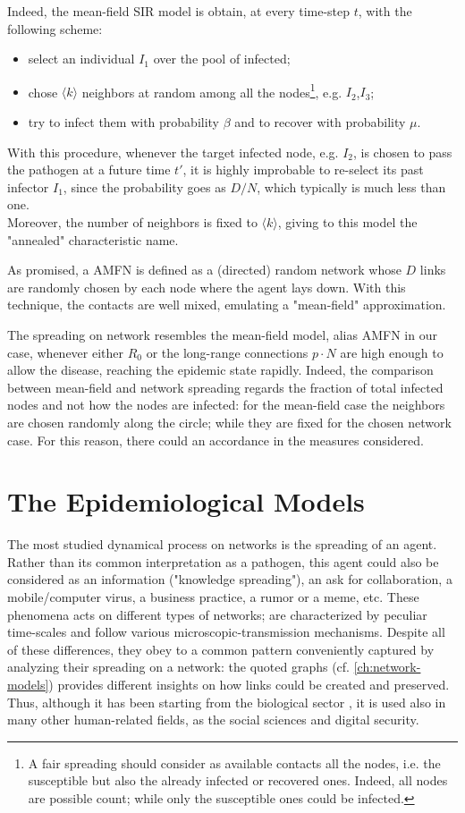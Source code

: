 \documentclass[a4paper,10pt,twoside]{book} %
\theoremstyle{definition}
\begin{document}
Indeed, the mean-field SIR model is obtain, at every time-step $t$, with the following scheme: 
\begin{itemize}
	\item select an individual $I_1$ over the pool of infected;
	\item chose $\langle k \rangle$ neighbors at random among all the nodes\footnote{A fair spreading should consider as available contacts all the nodes, i.e. the susceptible but also the already infected or recovered ones. Indeed, all nodes are possible count; while only the susceptible ones could be infected.}, e.g. $I_2$,$I_3$;
	\item try to infect them with probability $\beta$ and to recover with probability $\mu$.
\end{itemize}
With this procedure, whenever the target infected node, e.g. $I_2$, is chosen to pass the pathogen at a future time $t'$, it is highly improbable to re-select its past infector $I_1$, since the probability goes as $D/N$, which typically is much less than one. 
\\Moreover, the number of neighbors is fixed to $\langle k \rangle$, giving to this model the "annealed" characteristic name.

As promised, a AMFN is defined as a (directed) random network whose $D$ links are randomly chosen by each node where the agent lays down. With this technique, the contacts are well mixed, emulating a "mean-field" approximation.

The spreading on network resembles the mean-field model, alias AMFN in our case, whenever either $R_0$ or the long-range connections $p \cdot N$ are high enough to allow the disease, reaching the epidemic state rapidly. Indeed, the comparison between mean-field and network spreading regards the fraction of total infected nodes and not how the nodes are infected: for the mean-field case the neighbors are chosen randomly along the circle; while they are fixed for the chosen network case. For this reason, there could an accordance in the measures considered.



\chapter{The Epidemiological Models}
\label{ch:sir-models}	
The most studied dynamical process on networks is the spreading of an agent. Rather than its common interpretation as a pathogen, this agent could also be considered as an information ("knowledge spreading"), an ask for collaboration, a mobile/computer virus, a business practice, a rumor or a meme, etc. These phenomena acts on different types of networks; are characterized by peculiar time-scales and follow various microscopic-transmission mechanisms. Despite all of these differences, they obey to a common pattern conveniently captured by analyzing their spreading on a network: the quoted graphs (cf. \autoref{ch:network-models}) provides different insights on how links could be created and preserved. Thus, although it has been starting from the biological sector \cite{VespignaniSatorras2001Epidemic}, it is used also in many other human-related fields, as the social sciences and digital security.
\end{document}
